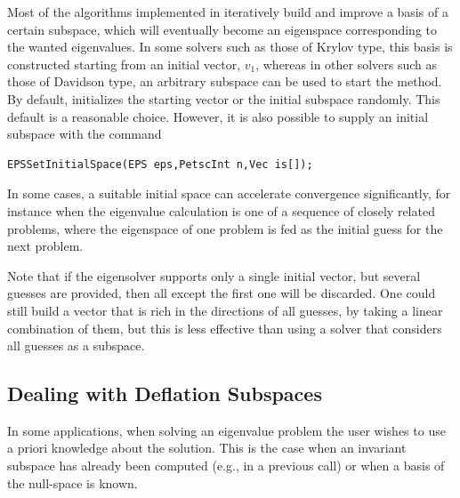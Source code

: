 Most of the algorithms implemented in  iteratively build and improve a basis of a certain subspace, which will eventually become an eigenspace corresponding to the wanted eigenvalues. In some solvers such as those of Krylov type, this basis is constructed starting from an initial vector, $v_1$, whereas in other solvers such as those of Davidson type, an arbitrary subspace can be used to start the method. By default,  initializes the starting vector or the initial subspace randomly. This default is a reasonable choice. However, it is also possible to supply an initial subspace with the command
        \begin{Verbatim}[fontsize=\small]
        EPSSetInitialSpace(EPS eps,PetscInt n,Vec is[]);
        \end{Verbatim}
In some cases, a suitable initial space can accelerate convergence significantly, for instance when the eigenvalue calculation is one of a sequence of closely related problems, where the eigenspace of one problem is fed as the initial guess for the next problem.

Note that if the eigensolver supports only a single initial vector, but several guesses are provided, then all except the first one will be discarded. One could still build a vector that is rich in the directions of all guesses, by taking a linear combination of them, but this is less effective than using a solver that considers all guesses as a subspace.

\subsection{Dealing with Deflation Subspaces}

In some applications, when solving an eigenvalue problem the user wishes to use a priori knowledge about the solution. This is the case when an invariant subspace has already been computed (e.g., in a previous  call) or when a basis of the null-space is known.

